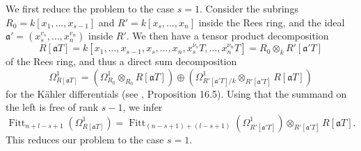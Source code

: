 \documentclass[oneside, 12pt]{amsart}
\theoremstyle{definition}
\theoremstyle{remark}
\newcommand{\ideala}{\mathfrak{a}}
\newcommand{\Fitt}{\operatorname{Fitt}}
\begin{document}
\proof
We first reduce the problem to the case $s=1$.  Consider the subrings  $R_0=k[x_1,\ldots,x_{s-1}]$ and $R'=k[x_s,\ldots,x_n]$
inside the Rees ring,  and the ideal  $\ideala'=(x_s^{v_s},\ldots,x_n^{v_n})$ inside $R'$. We then have a tensor product decomposition
$$
R[\ideala T]= k[x_1,\ldots, x_{s-1},x_s,\ldots,x_n, x_s^{\nu_s}T,\ldots,x_n^{\nu_n}T] = R_0\otimes_k R'[\ideala' T]
$$
of the Rees ring, and thus a direct sum decomposition
$$
\Omega^1_{R[\ideala T]} = \left(\Omega^1_{R_0}\otimes_{R_0} R[\ideala T]\right)  \oplus
\left( \Omega^1_{R'[\ideala' T]/k}\otimes_{R'[\ideala' T]} R[\ideala T]\right)
$$
for the K\"ahler differentials (see \cite{Eisenbud 1995}, Proposition 16.5). 
Using that the  summand on the left is free of rank $s-1$, we infer
\[ \Fitt_{n+l-s+1}(\Omega^1_{R[\ideala T]}) = 
\Fitt_{(n-s+1)+(l-s+1)}(\Omega^1_{R'[\ideala' T]})\otimes_{R'[\ideala' T]} R[\ideala T]. \]
This reduces our problem to the case $s=1$.
\end{document}
